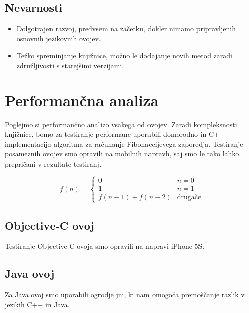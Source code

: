 \subsection{Nevarnosti}

\begin{itemize}
  \item Dolgotrajen razvoj, predvsem na začetku, dokler nimamo pripravljenih osnovnih jezikovnih ovojev.
  \item Težko spreminjanje knjižnice, možno le dodajanje novih metod zaradi združljivosti s starejšimi verzijami.
\end{itemize}

\section{Performančna analiza}

Poglejmo si performančno analizo vsakega od ovojev. Zaradi kompleksnosti knjižnice, bomo za testiranje performanc uporabili domorodno in C++ implementacijo algoritma za računanje Fibonaccijevega zaporedja. Testiranje posameznih ovojev smo opravili na mobilnih napravh, saj smo le tako lahko prepričani v rezultate testiranj.

\begin{equation}
\label{eq:fibonacci}
    f(n) = \begin{cases}
               0               & n = 0\\
               1               & n = 1\\
               f(n-1) + f(n-2) & \text{drugače}
           \end{cases}
\end{equation}

\subsection{Objective-C ovoj}

Testiranje Objective-C ovoja smo opravili na napravi iPhone 5S.

\subsection{Java ovoj}

Za Java ovoj smo uporabili ogrodje \gls{jni}, ki nam omogoča premoščanje razlik v jezikih C++ in Java.



